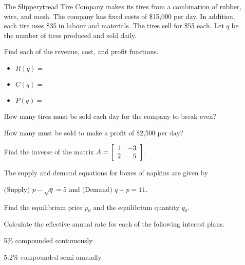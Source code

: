 \documentclass[12pt,legalpaper]{exam}
\begin{document}
\begin{questions}
\question[5] The Slipperytread Tire Company makes its tires from a combination of rubber, wire, and mesh.  The company has fixed costs of \$15,000 per day.  In addition, each tire uses \$35 in labour and materials.  The tires sell for \$55 each.  Let $q$ be the number of tires produced and sold daily.
\begin{compactenum}[(a)]
\item Find each of the revenue, cost, and profit functions.
\vspace{1.5cm}
\begin{itemize}
\item[] $R(q) =$
\vspace{1.5cm}

\item[] $C(q) =$
\vspace{1.5cm}

\item[] $P(q) =$
\end{itemize}
\vspace{1.5cm}

\item How many tires must be sold each day for the company to break even?
\vspace{5cm}

\item How many must be sold to make a profit of \$2,500 per day?
\end{compactenum}
\vspace{5cm}

\question[3] Find the inverse of the matrix $A = \MATRIX{rr}{1 & -3\\2 & 5}$.
\newpage

\question[4] The supply and demand equations for boxes of napkins are given by
\begin{center}
$\text{(Supply) }p - \sqrt{q} = 5$ and $\text{(Demand) }q + p = 11$.
\end{center}
Find the equilibrium price $p_{0}$ and the equilibrium quantity $q_{0}$.
\vspace{15cm}

\question[3] Calculate the effective annual rate for each of the following interest plans.
\begin{compactenum}[(a)]
\item 5\% compounded continuously
\vspace{5cm}

\item 5.2\% compounded semi-annually
\vspace{5cm}
\end{compactenum}
\newpage


\end{questions}
\end{document}
